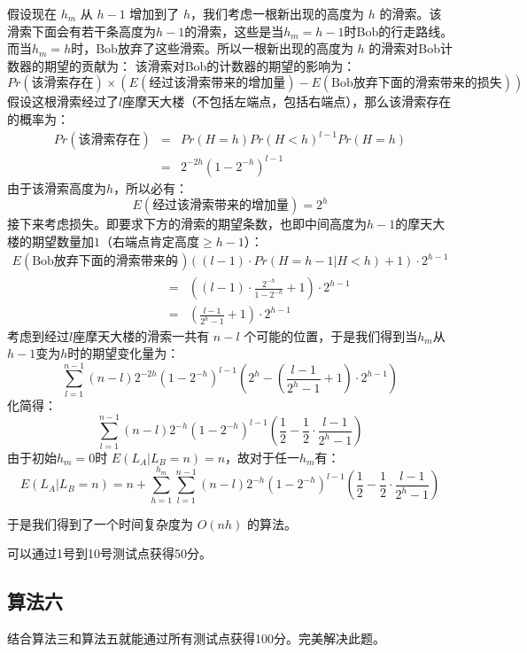 \documentclass[11pt, a4paper]{article}
\begin{document}
假设现在 $h_m$ 从 $h - 1$ 增加到了 $h$，我们考虑一根新出现的高度为 $h$ 的滑索。该滑索下面会有若干条高度为$h - 1$的滑索，这些是当$h_m = h - 1$时Bob的行走路线。而当$h_m = h$时，Bob放弃了这些滑索。所以一根新出现的高度为 $h$ 的滑索对Bob计数器的期望的贡献为：
该滑索对Bob的计数器的期望的影响为：
\begin{equation}
Pr(\text{该滑索存在}) \times \left( E(\text{经过该滑索带来的增加量}) - E(\text{Bob放弃下面的滑索带来的损失}) \right)
\end{equation}
假设这根滑索经过了$l$座摩天大楼（不包括左端点，包括右端点），那么该滑索存在的概率为：
\begin{eqnarray}
Pr(\text{该滑索存在}) & = & Pr(H = h) Pr(H < h)^{l - 1} Pr(H = h)\\
& = & 2^{-2h} (1 - 2^{-h})^{l - 1}
\end{eqnarray}
由于该滑索高度为$h$，所以必有：
\begin{equation}
E(\text{经过该滑索带来的增加量}) = 2^h
\end{equation}
接下来考虑损失。即要求下方的滑索的期望条数，也即中间高度为$h - 1$的摩天大楼的期望数量加$1$（右端点肯定高度$\geq h - 1$）：
\begin{eqnarray}
E(\text{Bob放弃下面的滑索带来的损失}) & = & \left((l - 1) \cdot Pr(H = h - 1 | H < h) + 1 \right) \cdot 2^{h - 1}\\
& = & \left((l - 1) \cdot \frac{2^{-h}}{1 - 2^{-h}} + 1 \right) \cdot 2^{h - 1}\\
& = & \left(\frac{l - 1}{2^h - 1} + 1 \right) \cdot 2^{h - 1}
\end{eqnarray}
考虑到经过$l$座摩天大楼的滑索一共有 $n - l$ 个可能的位置，于是我们得到当$h_m$从$h - 1$变为$h$时的期望变化量为：
\begin{equation}
\sum_{l = 1}^{n - 1}{(n - l) 2^{-2h} (1 - 2^{-h})^{l - 1} \left(2^h - \left(\frac{l - 1}{2^h - 1} + 1 \right) \cdot 2^{h - 1} \right)}
\end{equation}
化简得：
\begin{equation}
\sum_{l = 1}^{n - 1}{(n - l) 2^{-h} (1 - 2^{-h})^{l - 1} \left(\frac{1}{2} - \frac{1}{2} \cdot \frac{l - 1}{2^h - 1} \right)}
\end{equation}
由于初始$h_m = 0$时 $E(L_A | L_B = n) = n$，故对于任一$h_m$有：
\begin{equation}
E(L_A | L_B = n) = n + \sum_{h = 1}^{h_m}{\sum_{l = 1}^{n - 1}{(n - l) 2^{-h} (1 - 2^{-h})^{l - 1} \left(\frac{1}{2} - \frac{1}{2} \cdot \frac{l - 1}{2^h - 1} \right)}}
\end{equation}

于是我们得到了一个时间复杂度为 $O(nh)$ 的算法。

可以通过1号到10号测试点获得50分。

\subsection*{算法六}
结合算法三和算法五就能通过所有测试点获得100分。完美解决此题。
\end{document}
